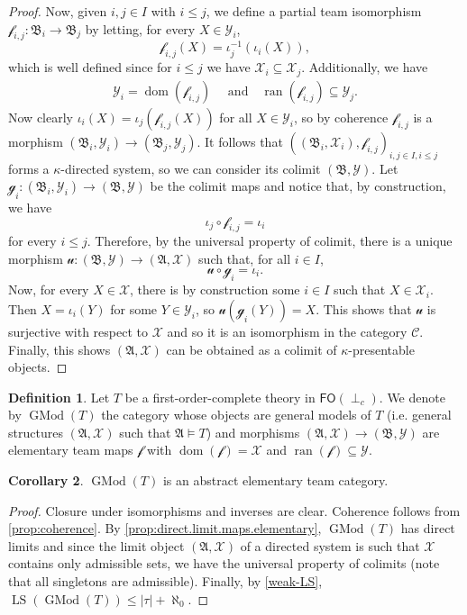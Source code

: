 \documentclass[a4paper]{amsart}
\theoremstyle{definition}
\newtheorem{definition}{Definition}[section]
\newtheorem{corollary}[definition]{Corollary}
\theoremstyle{remark}
\newcommand{\A}{\mathcal{A}}
\newcommand{\B}{\mathcal{B}}
\DeclareMathOperator{\dom}{dom}
\DeclareMathOperator{\ran}{ran}
\newcommand\foil{\mathsf{FO}(\perp_c)}
\newcommand{\Y}{\mathcal{Y}}
\newcommand{\X}{\mathcal{X}}
\DeclareMathOperator{\LS}{LS}
\theoremstyle{definition}
\renewcommand{\A}{\mathfrak{A}}
\renewcommand{\B}{\mathfrak{B}}
\newcommand{\f}{\mathcal{f}}
\newcommand{\g}{\mathcal{g}}
\DeclareMathOperator{\GMod}{GMod}
\begin{document}
\begin{proof}
    Now, given $i,j\in I$ with $i\leq j$, we define a partial team isomorphism $\f_{i,j}\colon\B_i\to\B_j$ by letting, for every $X\in\Y_i$,
    \[
        \f_{i,j}(X) = \iota_{j}^{-1}(\iota_i (X)),
    \]
    which is well defined since for $i\leq j$ we have $\X_i\subseteq\X_j$. Additionally, we have
    \begin{align*}
       \Y_i=\dom(\f_{i,j}) \quad\text{  and}\quad \ran(\f_{i,j})\subseteq \Y_j.
    \end{align*}
    Now clearly $\iota_i(X) = \iota_j(\f_{i,j}(X))$ for all $X\in\Y_i$, so by coherence $\f_{i,j}$ is a morphism $(\B_i,\Y_i)\to(\B_j,\Y_j)$. It follows that $((\B_i,\X_i),\f_{i,j})_{i,j\in I,i\leq j}$ forms a $\kappa$-directed system, so we can consider its colimit $(\B,\Y)$. Let $\g_i\colon(\B_i,\Y_i)\to(\B,\Y)$ be the colimit maps and notice that, by construction, we have
    \[
        \iota_j\circ \f_{i,j} = \iota_i
    \]
    for every $i\leq j$. Therefore, by the universal property of colimit, there is a unique morphism $\mathcal u\colon(\B,\Y)\to(\A,\X)$ such that, for all $i\in I$,
    \[
        \mathcal u\circ\g_i = \iota_i.
    \]
    Now, for every $X\in\X$, there is by construction some $i\in I$ such that $X\in\X_i$. Then $X = \iota_i(Y)$ for some $Y\in\Y_i$, so $\mathcal u(\g_i(Y))=X$. This shows that $\mathcal u$ is surjective with respect to $\X$ and so it is an isomorphism in the category $\mathcal C$. Finally, this shows $(\A,\X)$ can be obtained as a  colimit of $\kappa$-presentable objects.
\end{proof}



\begin{definition}
    Let $T$ be a first-order-complete theory in $\foil$. We denote by $\GMod(T)$ the category whose objects are general models of $T$ (i.e. general structures $(\A,\X)$ such that $\A\models T$) and morphisms $(\A,\X)\to(\B,\Y)$ are elementary team maps $\f$ with $\dom(\f)=\X$ and $\ran(\f)\subseteq\Y$.
\end{definition}



\begin{corollary}
    $\GMod(T)$ is an abstract elementary team category.
\end{corollary}
\begin{proof}
    Closure under isomorphisms and inverses are clear. Coherence follows from \cref{prop:coherence}. By \cref{prop:direct.limit.maps.elementary}, $\GMod(T)$ has direct limits and since the limit object $(\A,\X)$ of a directed system is such that $\X$ contains only admissible sets, we have the universal property of colimits (note that all singletons are admissible). Finally, by \cref{weak-LS}, $\LS(\GMod(T))\leq|\tau|+\aleph_0$.
\end{proof}
\end{document}
